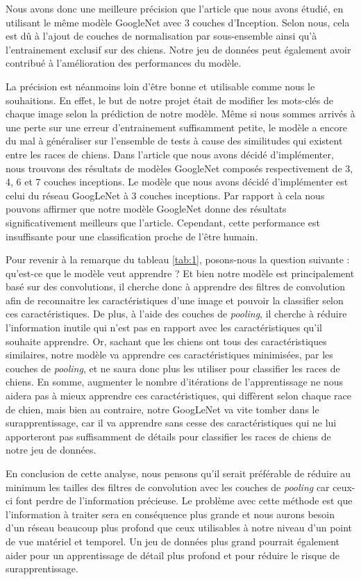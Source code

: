 \documentclass{article}
\begin{document}
Nous avons donc une meilleure précision que l’article que nous avons étudié,
en utilisant le même modèle GoogleNet avec 3 couches d'Inception. Selon nous, cela
est dû à l’ajout de couches de normalisation par sous-ensemble ainsi qu’à
l’entrainement exclusif sur des chiens. Notre jeu de données peut également avoir
contribué à l'amélioration des performances du modèle.

La précision est néanmoins loin d’être bonne et utilisable comme nous le
souhaitions. En effet, le but de notre projet était de modifier les mots-clés de
chaque image selon la prédiction de notre modèle. Même si nous sommes arrivés à
une perte sur une erreur d’entrainement suffisamment petite, le modèle a encore
du mal à généraliser sur l’ensemble de tests à cause des similitudes qui
existent entre les races de chiens. Dans l'article que nous avons décidé
d'implémenter, nous trouvons des résultats de modèles GoogleNet composés respectivement
de 3, 4, 6 et 7 couches inceptions. Le modèle que nous avons décidé d'implémenter
est celui du réseau GoogLeNet à 3 couches inceptions. Par rapport à cela nous
pouvons affirmer que notre modèle GoogleNet donne des résultats
significativement meilleurs que l'article. Cependant, cette performance est
insuffisante pour une classification proche de l'être humain.

Pour revenir à la remarque du tableau \ref{tab:1}, posons-nous la question
suivante : qu’est-ce que le modèle veut apprendre ? Et bien notre modèle est
principalement basé sur des convolutions, il cherche donc à apprendre des
filtres de convolution afin de reconnaitre les caractéristiques d’une image et
pouvoir la classifier selon ces caractéristiques. De plus, à l’aide des
couches de \textit{pooling}, il cherche à réduire l’information inutile qui
n’est pas en rapport avec les caractéristiques qu’il souhaite apprendre. Or,
sachant que les chiens ont tous des caractéristiques similaires, notre modèle va
apprendre ces caractéristiques minimisées, par les couches de \textit{pooling},
et ne saura donc plus les utiliser pour classifier les races de chiens. En
somme, augmenter le nombre d’itérations de l’apprentissage ne nous aidera pas à
mieux apprendre ces caractéristiques, qui diffèrent selon chaque race de chien,
mais bien au contraire, notre GoogLeNet va vite tomber dans le surapprentissage,
car il va apprendre sans cesse des caractéristiques qui ne lui apporteront pas
suffisamment de détails pour classifier les races de chiens de notre jeu de
données. 

En conclusion de cette analyse, nous pensons qu’il serait préférable de réduire
au minimum les tailles des filtres de convolution avec les couches de
\textit{pooling} car ceux-ci font perdre de l’information précieuse. Le problème
avec cette méthode est que l’information à traiter sera en conséquence plus
grande et nous aurons besoin d’un réseau beaucoup plus profond que ceux
utilisables à notre niveau d’un point de vue matériel et temporel. Un jeu de
données plus grand pourrait également aider pour un apprentissage
de détail plus profond et pour réduire le risque de surapprentissage.



\end{document}
